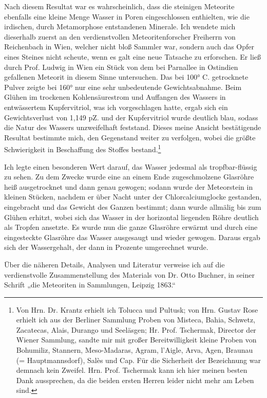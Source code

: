 \documentclass[a4paper, 11pt, oneside, german]{article}
\begin{document}
Nach diesem Resultat war es wahrscheinlich, dass die steinigen Meteorite ebenfalls eine kleine Menge Wasser in Poren eingeschlossen enthielten, wie die irdischen, durch Metamorphose entstandenen Minerale. Ich wendete mich dieserhalb zuerst an den verdienstvollen Meteoritenforscher Freiherrn von Reichenbach in Wien, welcher nicht bloß Sammler war, sondern auch das Opfer eines Steines nicht scheute, wenn es galt eine neue Tatsache zu erforschen. Er ließ durch Prof. Ludwig in Wien ein Stück von dem bei Parnallee in Ostindien gefallenen Meteorit in diesem Sinne untersuchen. Das bei 100° C. getrocknete Pulver zeigte bei 160° nur eine sehr unbedeutende Gewichtsabnahme. Beim Glühen im trockenen Kohlensäurestrom und Auffangen des Wassers in entwässertem Kupfervitriol, was ich vorgeschlagen hatte, ergab sich ein Gewichtsverlust von 1,149 pZ. und der Kupfervitriol wurde deutlich blau, sodass die Natur des Wassers unzweifelhaft feststand. Dieses meine Ansicht bestätigende Resultat bestimmte mich, den Gegenstand weiter zu verfolgen, wobei die größte Schwierigkeit in Beschaffung des Stoffes bestand.\footnote{Von Hrn. Dr. Krantz erhielt ich Tolucca und Pultusk; von Hrn. Gustav Rose erhielt ich aus der Berliner Sammlung Proben von Misteca, Bahia, Schwetz, Zacatecas, Alais, Durango und Seeläsgen; Hr. Prof. Tschermak, Director der Wiener Sammlung, sandte mir mit großer Bereitwilligkeit kleine Proben von Bohumiliz, Stannern, Meso-Madaras, Agram, l'Aigle, Arva, Agen, Braunau (= Hauptmannsdorf), Salès und Cap. Für die Sicherheit der Bezeichnung war demnach kein Zweifel. Hrn. Prof. Tschermak kann ich hier meinen besten Dank aussprechen, da die beiden ersten Herren leider nicht mehr am Leben sind.}

Ich legte einen besonderen Wert darauf, das Wasser jedesmal als tropfbar-flüssig zu sehen. Zu dem Zwecke wurde eine an einem Ende zugeschmolzene Glasröhre heiß ausgetrocknet und dann genau gewogen; sodann wurde der Meteorstein in kleinen Stücken, nachdem er über Nacht unter der Chlorcalciumglocke gestanden, eingebracht und das Gewicht des Ganzen bestimmt; dann wurde allmälig bis zum Glühen erhitzt, wobei sich das Wasser in der horizontal liegenden Röhre deutlich als Tropfen ansetzte. Es wurde nun die ganze Glasröhre erwärmt und durch eine eingesteckte Glasröhre das Wasser ausgesaugt und wieder gewogen. Daraus ergab sich der Wassergehalt, der dann in Prozente umgerechnet wurde.

Über die näheren Details, Analysen und Literatur verweise ich auf die verdienstvolle Zusammenstellung des Materials von Dr. Otto Buchner, in seiner Schrift „die Meteoriten in Sammlungen, Leipzig 1863.“
\end{document}
